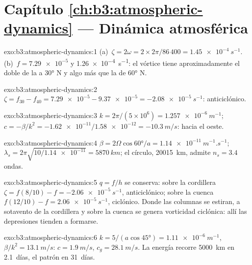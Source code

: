 \section*{Capítulo \ref{ch:b3:atmospheric-dynamics} --- Dinámica atmosférica}

\begin{solution}{exo:b3:atmospheric-dynamics:1}
(a)~$\zeta = 2\omega = 2\times2\pi/86\,400 = \qty{1.45e-4}{s^{-1}}$.
(b)~$f = \num{7.29e-5}$ y \qty{1.26e-4}{s^{-1}}: el vórtice tiene aproximadamente
el doble de la  a \ang{30} N y algo más que la de
\ang{60} N.
\end{solution}

\begin{solution}{exo:b3:atmospheric-dynamics:2}
$\zeta = f_{30} - f_{40} = \num{7.29e-5} - \num{9.37e-5} =
\qty{-2.08e-5}{s^{-1}}$: anticiclónico.
\end{solution}

\begin{solution}{exo:b3:atmospheric-dynamics:3}
$k = 2\pi/(5\times10^6) = \qty{1.257e-6}{m^{-1}}$; $c = -\beta/k^2 =
-\num{1.62e-11}/\num{1.58e-12} = \qty{-10.3}{m/s}$: hacia el oeste.
\end{solution}

\begin{solution}{exo:b3:atmospheric-dynamics:4}
$\beta = 2\Omega\cos\ang{60}/a = \qty{1.14e-11}{m^{-1}.s^{-1}}$;
$\lambda_s = 2\pi\sqrt{10/\num{1.14e-11}} = \qty{5870}{km}$; el círculo,
\qty{20015}{km}, admite $n_s = 3.4$ ondas.
\end{solution}

\begin{solution}{exo:b3:atmospheric-dynamics:5}
$q = f/h$ se conserva: sobre la cordillera $\zeta = f(8/10) - f =
\qty{-2.06e-5}{s^{-1}}$, anticiclónico; sobre la cuenca $f(12/10) - f =
\qty{+2.06e-5}{s^{-1}}$, ciclónico. Donde las columnas se estiran, a sotavento
de la cordillera y sobre la cuenca se genera vorticidad ciclónica: allí
las depresiones tienden a formarse.
\end{solution}

\begin{solution}{exo:b3:atmospheric-dynamics:6}
$k = 5/(a\cos\ang{45}) = \qty{1.11e-6}{m^{-1}}$, $\beta/k^2 =
\qty{13.1}{m/s}$: $c = \qty{1.9}{m/s}$, $c_g = \qty{28.1}{m/s}$. La energía
recorre \qty{5000}{km} en \num{2.1}~días, el patrón en \num{31}~días.
\end{solution}

